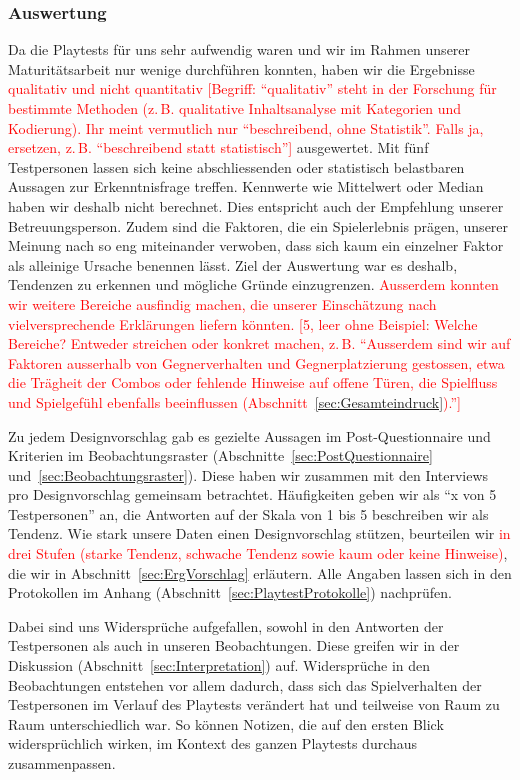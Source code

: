 \documentclass[../Main.tex]{subfiles}
\begin{document}
\subsubsection{Auswertung} \label{sec:Auswertung}
Da die Playtests für uns sehr aufwendig waren und wir im Rahmen unserer Maturitätsarbeit nur wenige durchführen konnten, haben wir die Ergebnisse \textcolor{red}{qualitativ und nicht quantitativ [Begriff: \enquote{qualitativ} steht in der Forschung für bestimmte Methoden (z.\,B. qualitative Inhaltsanalyse mit Kategorien und Kodierung). Ihr meint vermutlich nur \enquote{beschreibend, ohne Statistik}. Falls ja, ersetzen, z.\,B. \enquote{beschreibend statt statistisch}]} ausgewertet. Mit fünf Testpersonen lassen sich keine abschliessenden oder statistisch belastbaren Aussagen zur Erkenntnisfrage treffen. Kennwerte wie Mittelwert oder Median haben wir deshalb nicht berechnet. Dies entspricht auch der Empfehlung unserer Betreuungsperson. Zudem sind die Faktoren, die ein Spielerlebnis prägen, unserer Meinung nach so eng miteinander verwoben, dass sich kaum ein einzelner Faktor als alleinige Ursache benennen lässt. Ziel der Auswertung war es deshalb, Tendenzen zu erkennen und mögliche Gründe einzugrenzen. \textcolor{red}{Ausserdem konnten wir weitere Bereiche ausfindig machen, die unserer Einschätzung nach vielversprechende Erklärungen liefern könnten. [5, leer ohne Beispiel: Welche Bereiche? Entweder streichen oder konkret machen, z.\,B. \enquote{Ausserdem sind wir auf Faktoren ausserhalb von Gegnerverhalten und Gegnerplatzierung gestossen, etwa die Trägheit der Combos oder fehlende Hinweise auf offene Türen, die Spielfluss und Spielgefühl ebenfalls beeinflussen (Abschnitt~\ref{sec:Gesamteindruck}).}]}

Zu jedem Designvorschlag gab es gezielte Aussagen im Post-Questionnaire und Kriterien im Beobachtungsraster (Abschnitte~\ref{sec:PostQuestionnaire} und~\ref{sec:Beobachtungsraster}). Diese haben wir zusammen mit den Interviews pro Designvorschlag gemeinsam betrachtet. Häufigkeiten geben wir als \enquote{x von 5 Testpersonen} an, die Antworten auf der Skala von 1 bis 5 beschreiben wir als Tendenz. Wie stark unsere Daten einen Designvorschlag stützen, beurteilen wir \textcolor{red}{in drei Stufen (starke Tendenz, schwache Tendenz sowie kaum oder keine Hinweise)}, die wir in Abschnitt~\ref{sec:ErgVorschlag} erläutern. Alle Angaben lassen sich in den Protokollen im Anhang (Abschnitt~\ref{sec:PlaytestProtokolle}) nachprüfen.

Dabei sind uns Widersprüche aufgefallen, sowohl in den Antworten der Testpersonen als auch in unseren Beobachtungen. Diese greifen wir in der Diskussion (Abschnitt~\ref{sec:Interpretation}) auf. Widersprüche in den Beobachtungen entstehen vor allem dadurch, dass sich das Spielverhalten der Testpersonen im Verlauf des Playtests verändert hat und teilweise von Raum zu Raum unterschiedlich war. So können Notizen, die auf den ersten Blick widersprüchlich wirken, im Kontext des ganzen Playtests durchaus zusammenpassen.
\end{document}
